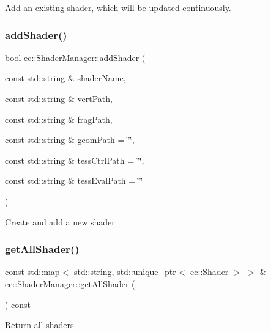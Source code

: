 Add an existing shader, which will be updated continuously. \mbox{\label{classec_1_1_shader_manager_a81a63a18679d10c93e75b11ded25e8f0}} 
\subsubsection{\texorpdfstring{add\+Shader()}{addShader()}\hspace{0.1cm}{\footnotesize\ttfamily [3/3]}}
{\footnotesize\ttfamily bool ec\+::\+Shader\+Manager\+::add\+Shader (\begin{DoxyParamCaption}\item[{const std\+::string \&}]{shader\+Name,  }\item[{const std\+::string \&}]{vert\+Path,  }\item[{const std\+::string \&}]{frag\+Path,  }\item[{const std\+::string \&}]{geom\+Path = {\ttfamily \char`\"{}\char`\"{}},  }\item[{const std\+::string \&}]{tess\+Ctrl\+Path = {\ttfamily \char`\"{}\char`\"{}},  }\item[{const std\+::string \&}]{tess\+Eval\+Path = {\ttfamily \char`\"{}\char`\"{}} }\end{DoxyParamCaption})}

Create and add a new shader \mbox{\label{classec_1_1_shader_manager_aaff28268f21b821c048f351684a0213f}} 
\subsubsection{\texorpdfstring{get\+All\+Shader()}{getAllShader()}}
{\footnotesize\ttfamily const std\+::map$<$ std\+::string, std\+::unique\+\_\+ptr$<$ \mbox{\hyperlink{classec_1_1_shader}{ec\+::\+Shader}} $>$ $>$ \& ec\+::\+Shader\+Manager\+::get\+All\+Shader (\begin{DoxyParamCaption}{ }\end{DoxyParamCaption}) const}

Return all shaders \mbox{\label{classec_1_1_shader_manager_a3e1390b9c15a6809ef07a10bac4112c7}} 
